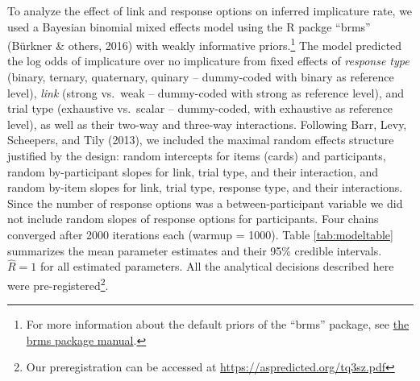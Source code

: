 \documentclass[man]{apa6}
\theoremstyle{definition}
\theoremstyle{definition}
\theoremstyle{definition}
\theoremstyle{remark}
\begin{document}
To analyze the effect of link and response options on inferred
implicature rate, we used a Bayesian binomial mixed effects model using
the R packge \enquote{brms} (Bürkner \& others, 2016) with weakly informative priors.\footnote{For more information about the
  default priors of the \enquote{brms} package, see
  \href{ftp://cran.r-project.org/pub/R/web/packages/brms/brms.pdf}{the
  brms package manual}.} The model predicted the log odds of implicature
over no implicature from fixed effects of \emph{response type} (binary,
ternary, quaternary, quinary -- dummy-coded with binary as reference
level), \emph{link} (strong vs.~weak -- dummy-coded with strong as
reference level), and trial type (exhaustive vs.~scalar -- dummy-coded,
with exhaustive as reference level), as well as their two-way and
three-way interactions. Following Barr, Levy, Scheepers, and Tily
(2013), we included the maximal random effects structure justified by
the design: random intercepts for items (cards) and participants, random
by-participant slopes for link, trial type, and their interaction, and
random by-item slopes for link, trial type, response type, and their
interactions. Since the number of response options was a between-participant variable we did not include random slopes of response
options for participants. Four chains converged after 2000 iterations
each (warmup = 1000). Table \ref{tab:modeltable} summarizes the mean
parameter estimates and their 95\% credible intervals. \(\hat{R}=1\) for
all estimated parameters. All the analytical decisions described here
were pre-registered\footnote{Our preregistration can be accessed at
  \url{https://aspredicted.org/tq3sz.pdf}}.
\end{document}
